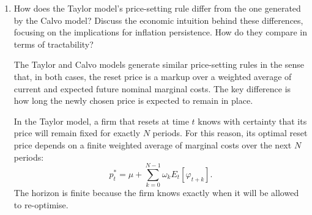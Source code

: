 \documentclass[dvipsnames,11pt]{article}
\begin{document}
\begin{enumerate}
\begin{solution}
\begin{align*}
    \hat p_t^*\sum_{k=0}^{N-1} \beta^k- \sum_{k=0}^{N-1} \beta ^k \mathbb{E}_t [\hat \psi_{t+k}]=0.
\end{align*}
Now, we know that $\hat p_t^* = p_t^*-p$ and $\hat \psi_t= \varphi_t-\varphi$, therefore:
\begin{align*}
    (p_t^*-p) \frac{1-\beta^N}{1-\beta}=\sum_{k=0}^{N-1}\beta^k \mathbb{E}_t [\varphi_{t+k}-\varphi]=\sum_{k=0}^{N-1}\beta^k \mathbb{E}_t [\varphi_{t+k}]-\varphi \frac{1-\beta^N}{1-\beta} .
\end{align*}
Moreover, from the steady state relation, we know that:
\[
p= \log P=\log \mathcal{M} \psi =\log \mathcal{M}+\log \psi =\mu +\varphi,
\]
and so:
\begin{align*}
    p_t^*&=\sum_{k=0}^{N-1}\frac{(1-\beta)\beta^k}{1-\beta^N}\mathbb{E}_t[\varphi_{t+k}]+p-\varphi \\
    & = \mu +\sum_{k=0}^{N-1} \omega _k \mathbb{E}_t [\varphi_{t+k}].
\end{align*}
Therefore, with the Taylor model of staggered price setting, the price $p_t^*$ set by each firm depends positively on the mark-up under flexible prices $\mathcal{M}$, on the current nominal marginal cost $\varphi_t$, and on the (discounted) expected nominal marginal costs for the following $N-1$ periods, in which the firm will not be able to reset the price.
            \end{solution}
    
        \item How does the Taylor model’s price-setting rule differ from the one generated by the Calvo model? Discuss the economic intuition behind these differences, focusing on the implications for inflation persistence. How do they compare in terms of tractability? 
    
            \begin{solution}
The Taylor and Calvo models generate similar price-setting rules in the sense that, in both cases, the reset price is a markup over a weighted average of current and expected future nominal marginal costs. The key difference is how long the newly chosen price is expected to remain in place.

In the Taylor model, a firm that resets at time $t$ knows with certainty that its price will remain fixed for exactly $N$ periods. For this reason, its optimal reset price depends on a finite weighted average of marginal costs over the next $N$ periods:
\[
p_t^*=\mu+\sum_{k=0}^{N-1}\omega_k E_t[\varphi_{t+k}].
\]
The horizon is finite because the firm knows exactly when it will be allowed to re-optimise.


\end{solution}
\end{enumerate}
\end{document}

